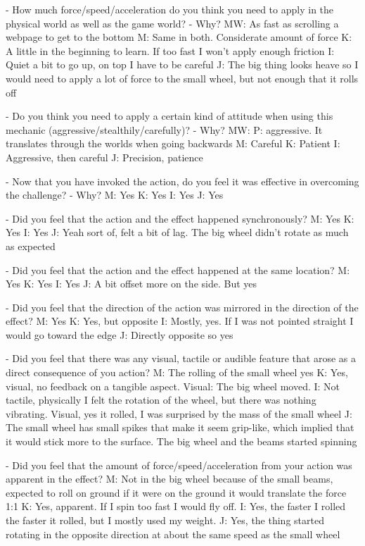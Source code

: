     - How much force/speed/acceleration do you think you need to apply in the physical world as well as the game world?
     - Why?
   MW: As fast as scrolling a webpage to get to the bottom
   M: Same in both. Considerate amount of force
   K: A little in the beginning to learn. If too fast I won't apply enough friction
   I: Quiet a bit to go up, on top I have to be careful
   J: The big thing looks heave so I would need to apply a lot of force to the small wheel, but not enough that it rolls off

    - Do you think you need to apply a certain kind of attitude when using this mechanic (aggressive/stealthily/carefully)?
     - Why?
   MW: P: aggressive. It translates through the worlds when going backwards
   M: Careful
   K: Patient
   I: Aggressive, then careful
   J: Precision, patience

  - Now that you have invoked the action, do you feel it was effective in overcoming the challenge?
   - Why?
   M: Yes
   K: Yes
   I: Yes
   J: Yes

    - Did you feel that the action and the effect happened synchronously?
    M: Yes
    K: Yes
    I: Yes
    J: Yeah sort of, felt a bit of lag. The big wheel didn't rotate as much as expected

    - Did you feel that the action and the effect happened at the same location?
    M: Yes
    K: Yes
    I: Yes
    J: A bit offset more on the side. But yes

    - Did you feel that the direction of the action was mirrored in the direction of the effect?
    M: Yes
    K: Yes, but opposite
    I: Mostly, yes. If I was not pointed straight I would go toward the edge
    J: Directly opposite so yes

    - Did you feel that there was any visual, tactile or audible feature that arose as a direct consequence of you action?
    M: The rolling of the small wheel yes
    K: Yes, visual, no feedback on a tangible aspect. Visual: The big wheel moved.
    I: Not tactile, physically I felt the rotation of the wheel, but there was nothing vibrating. Visual, yes it rolled, I was surprised by the mass of the small wheel
    J: The small wheel has small spikes that make it seem grip-like, which implied that it would stick more to the surface. The big wheel and the beams started spinning

    - Did you feel that the amount of force/speed/acceleration from your action was apparent in the effect?
    M: Not in the big wheel because of the small beams, expected to roll on ground if it were on the ground it would translate the force 1:1
    K: Yes, apparent. If I spin too fast I would fly off.
    I: Yes, the faster I rolled the faster it rolled, but I mostly used my weight.
    J: Yes, the thing started rotating in the opposite direction at about the same speed as the small wheel

